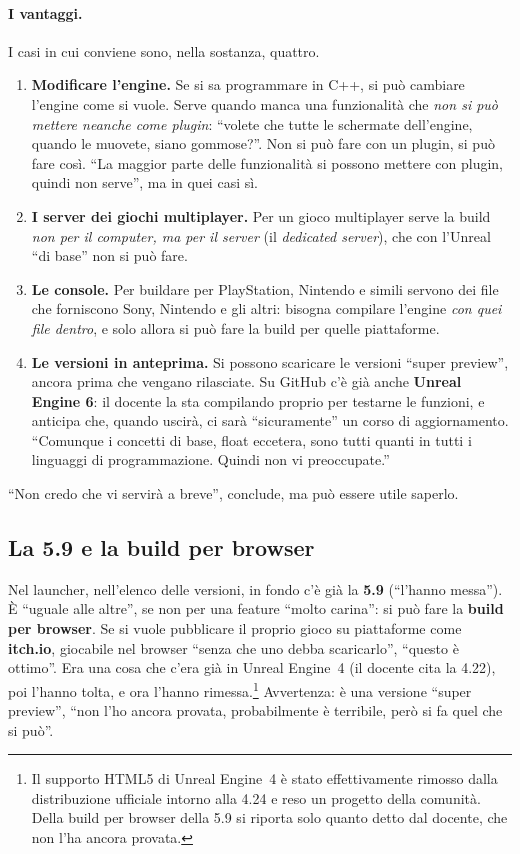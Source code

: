 \paragraph{I vantaggi.} I casi in cui conviene sono, nella sostanza, quattro.
\begin{enumerate}
  \item \textbf{Modificare l'engine.} Se si sa programmare in C++, si può
        cambiare l'engine come si vuole. Serve quando manca una funzionalità
        che \emph{non si può mettere neanche come plugin}: ``volete che
        tutte le schermate dell'engine, quando le muovete, siano
        gommose?''. Non si può fare con un plugin, si può fare così. ``La
        maggior parte delle funzionalità si possono mettere con plugin, quindi
        non serve'', ma in quei casi sì.
  \item \textbf{I server dei giochi multiplayer.} Per un gioco multiplayer
        serve la build \emph{non per il computer, ma per il server} (il
        \emph{dedicated server}), che con l'Unreal ``di base'' non si può
        fare.
  \item \textbf{Le console.} Per buildare per PlayStation, Nintendo e simili
        servono dei file che forniscono Sony, Nintendo e gli altri: bisogna
        compilare l'engine \emph{con quei file dentro}, e solo allora si può
        fare la build per quelle piattaforme.
  \item \textbf{Le versioni in anteprima.} Si possono scaricare le versioni
        ``super preview'', ancora prima che vengano rilasciate. Su GitHub c'è
        già anche \textbf{Unreal Engine 6}: il docente la sta compilando
        proprio per testarne le funzioni, e anticipa che, quando uscirà, ci
        sarà ``sicuramente'' un corso di aggiornamento. ``Comunque i concetti
        di base, float eccetera, sono tutti quanti in tutti i linguaggi di
        programmazione. Quindi non vi preoccupate.''
\end{enumerate}
``Non credo che vi servirà a breve'', conclude, ma può essere utile saperlo.

\subsection{La 5.9 e la build per browser}

Nel launcher, nell'elenco delle versioni, in fondo c'è già la \textbf{5.9}
(``l'hanno messa''). È ``uguale alle altre'', se non per una feature ``molto
carina'': si può fare la \textbf{build per browser}. Se si vuole pubblicare il
proprio gioco su piattaforme come \textbf{itch.io}, giocabile nel browser
``senza che uno debba scaricarlo'', ``questo è ottimo''. Era una cosa che
c'era già in Unreal Engine~4 (il docente cita la 4.22), poi l'hanno tolta, e
ora l'hanno rimessa.\footnote{Il supporto HTML5 di Unreal Engine~4 è stato
effettivamente rimosso dalla distribuzione ufficiale intorno alla 4.24 e reso
un progetto della comunità. Della build per browser della 5.9 si riporta solo
quanto detto dal docente, che non l'ha ancora provata.} Avvertenza: è una
versione ``super preview'', ``non l'ho ancora provata, probabilmente è
terribile, però si fa quel che si può''.

